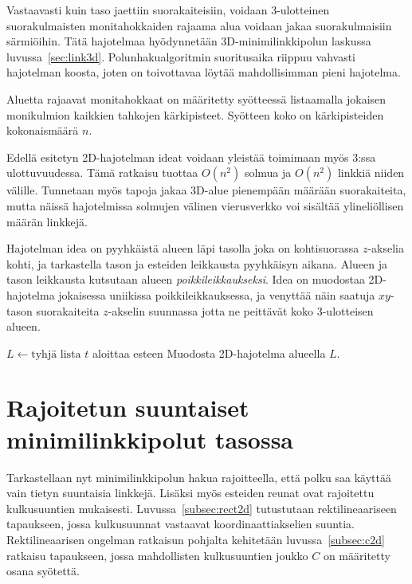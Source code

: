 \documentclass[finnish]{tktltiki2}
\theoremstyle{definition}
\theoremstyle{remark}
\begin{document}
Vastaavasti kuin taso jaettiin suorakaiteisiin, voidaan 3-ulotteinen suorakulmaisten monitahokkaiden rajaama alua voidaan jakaa suorakulmaisiin särmiöihin.
Tätä hajotelmaa hyödynnetään 3D-minimilinkkipolun laskussa luvussa~\ref{sec:link3d}.
Polunhakualgoritmin suoritusaika riippuu vahvasti hajotelman koosta, joten on toivottavaa löytää mahdollisimman pieni hajotelma.

Aluetta rajaavat monitahokkaat on määritetty syötteessä listaamalla jokaisen monikulmion kaikkien tahkojen kärkipisteet.
Syötteen koko on kärkipisteiden kokonaismäärä $n$.

Edellä esitetyn 2D-hajotelman ideat voidaan yleistää toimimaan myös 3:ssa ulottuvuudessa.
Tämä ratkaisu tuottaa $O(n^2)$ solmua ja $O(n^2)$ linkkiä niiden välille.
Tunnetaan myös tapoja jakaa 3D-alue pienempään määrään suorakaiteita, mutta näissä hajotelmissa solmujen välinen vierusverkko voi sisältää ylineliöllisen määrän linkkejä.

Hajotelman idea on pyyhkäistä alueen läpi tasolla joka on kohtisuorassa $z$-akselia kohti, ja tarkastella tason ja esteiden leikkausta pyyhkäisyn aikana.
Alueen ja tason leikkausta kutsutaan alueen \emph{poikkileikkaukseksi}.
Idea on muodostaa 2D-hajotelma jokaisessa uniikissa poikkileikkauksessa, ja venyttää näin saatuja $xy$-tason suorakaiteita $z$-akselin suunnassa jotta ne peittävät koko 3-ulotteisen alueen.

\begin{algorithmic}\label{jako3d}
\State $L \gets \text{tyhjä lista}$
	\If $t$ aloittaa esteen
	\Else
	\EndIf
	\State Muodosta 2D-hajotelma alueella $L$.
\EndFor
\end{algorithmic}



\section{Rajoitetun suuntaiset minimilinkkipolut tasossa}\label{sec:limited2d}

Tarkastellaan nyt minimilinkkipolun hakua rajoitteella, että polku saa käyttää vain tietyn suuntaisia linkkejä.
Lisäksi myös esteiden reunat ovat rajoitettu kulkusuuntien mukaisesti.
Luvussa~\ref{subsec:rect2d} tutustutaan rektilineaariseen tapaukseen, jossa kulkusuunnat vastaavat koordinaattiakselien suuntia.
Rektilineaarisen ongelman ratkaisun pohjalta kehitetään luvussa~\ref{subsec:c2d} ratkaisu tapaukseen, jossa mahdollisten kulkusuuntien joukko $C$ on määritetty osana syötettä.
\end{document}
